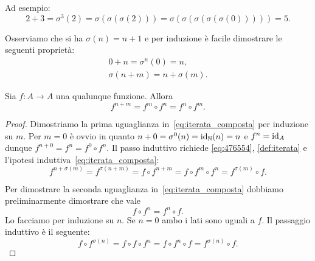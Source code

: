 Ad esempio:
\[
  2 + 3 
  = \sigma^3(2) 
  = \sigma(\sigma(\sigma(2))) 
  = \sigma(\sigma(\sigma(\sigma(\sigma(0))))) = 5.
\]

Osserviamo che si ha $\sigma(n) = n+1$ e per induzione 
è facile dimostrare le seguenti proprietà:
\begin{gather*}
   0 + n = \sigma^n(0) = n, \\
   \sigma(n+m) = n + \sigma(m). \label{eq:476554}
\end{gather*}

\begin{theorem}
  \label{th:iterata_composta}%
  Sia $f\colon A \to A$ una qualunque funzione.
  Allora 
  \begin{equation}\label{eq:iterata_composta}
    f^{n+m} = f^m \circ f^n = f^n \circ f^m.
  \end{equation}
\end{theorem}
%
\begin{proof}
Dimostriamo la prima uguaglianza in~\eqref{eq:iterata_composta} 
per induzione su $m$.
Per $m=0$ è ovvio in quanto $n+0 = \sigma^0(n)=\mathrm{id}_{{\mathbb N}}(n)=n$ e $f^n=\mathrm{id}_A$
dunque $f^{n+0} = f^n = f^0 \circ f^n$.
Il passo induttivo richiede \eqref{eq:476554},
\eqref{def:iterata} e l'ipotesi induttiva~\eqref{eq:iterata_composta}:
\[
f^{n+\sigma(m)} 
= f^{\sigma(n+m)}
= f\circ f^{n+m}
= f\circ f^m \circ f^n
= f^{\sigma(m)}\circ f.
\]

Per dimostrare la seconda uguaglianza in~\eqref{eq:iterata_composta}
dobbiamo preliminarmente dimostrare che vale 
\begin{equation}\label{eq:5ty349}
  f\circ f^n = f^n \circ f.  
\end{equation}
Lo facciamo per induzione su $n$. Se $n=0$ ambo i lati sono uguali a $f$.
Il passaggio induttivo è il seguente:
\[
  f\circ f^{\sigma(n)} = f\circ f\circ f^n = f\circ f^n \circ f 
  = f^{\sigma(n)} \circ f.
\]
\end{proof}

